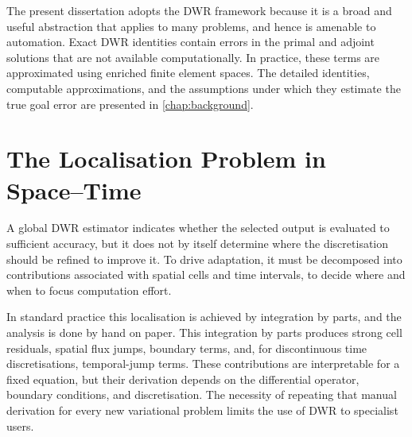 The present dissertation adopts the DWR framework because it is a broad and useful abstraction that applies to many problems, and hence is amenable to automation. 
Exact DWR identities contain errors in the primal and adjoint solutions that are not available computationally. In practice, these terms are approximated using enriched finite element spaces. The detailed identities, computable approximations, and the assumptions under which they estimate the true goal error are presented in \cref{chap:background}.


\section{The Localisation Problem in Space--Time}
\label{sec:introduction-localisation}

A global DWR estimator indicates whether the selected output is evaluated to sufficient accuracy, but it does not by itself determine where the discretisation should be refined to improve it. To drive adaptation, it must be decomposed into contributions associated with spatial cells and time intervals, to decide where and when to focus computation effort.

In standard practice this localisation is achieved by integration by parts, and the analysis is done by hand on paper. This integration by parts produces strong cell residuals, spatial flux jumps, boundary terms, and, for discontinuous time discretisations, temporal-jump terms. These contributions are interpretable for a fixed equation, but their derivation depends on the differential operator, boundary conditions, and discretisation. The necessity of repeating that manual derivation for every new variational problem limits the use of DWR to specialist users.


